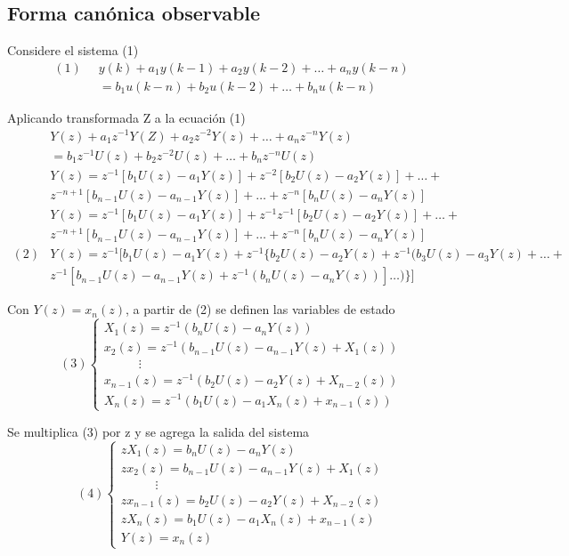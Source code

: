 \subsection{Forma canónica observable}

Considere el sistema (1)
\[
    \begin{split}
        (1) \;\; & y(k) + a_{1}y(k-1) + a_{2}y(k-2) + \ldots + a_{n}y(k-n) \\
            & = b_{1}u(k-n) + b_{2}u(k-2) + \ldots + b_{n}u(k-n)
    \end{split}
\]

Aplicando transformada Z a la ecuación (1)
\[
    \begin{split}
        & Y(z) + a_{1}z^{-1}Y(Z) + a_{2}z^{-2}Y(z) + \ldots + a_{n}z^{-n}Y(z) \\
        & = b_{1}z^{-1}U(z) + b_{2}z^{-2}U(z) + \ldots + b_{n}z^{-n}U(z) \\
        & Y(z) = z^{-1}[b_{1}U(z)-a_{1}Y(z)] + z^{-2}[b_{2}U(z)-a_{2}Y(z)] + \ldots + \\
        & z^{-n+1}[b_{n-1}U(z)-a_{n-1}Y(z)] + \ldots + z^{-n}[b_{n}U(z)-a_{n}Y(z)] \\
        & Y(z) = z^{-1}[b_{1}U(z)-a_{1}Y(z)] + z^{-1}z^{-1}[b_{2}U(z)-a_{2}Y(z)] + \ldots + \\
        & z^{-n+1}[b_{n-1}U(z)-a_{n-1}Y(z)] + \ldots + z^{-n}[b_{n}U(z)-a_{n}Y(z)] \\
        (2) & Y(z) = z^{-1} [b_{1}U(z)-a_{1}Y(z) + z^{-1}\{b_{2}U(z)-a_{2}Y(z) + z^{-1}(b_{3}U(z)-a_{3}Y(z) + \ldots + \\
        & z^{-1}[b_{n-1}U(z)-a_{n-1}Y(z) + z^{-1}(b_{n}U(z)-a_{n}Y(z))]\ldots)\}]
    \end{split}
\]

Con \( Y(z) = x_{n}(z) \), a partir de (2) se definen las variables de estado
\[(3)
    \left\{
        \begin{array}{lll}
            X_{1}(z) = z^{-1}(b_{n}U(z)-a_{n}Y(z)) \\ 
            x_{2}(z) = z^{-1}(b_{n-1}U(z)-a_{n-1}Y(z)+X_{1}(z)) \\
            \;\;\;\;\;\;\;\;\;\; \vdots \\
            x_{n-1}(z) = z^{-1}(b_{2}U(z)-a_{2}Y(z) + X_{n-2}(z)) \\
            X_{n}(z) = z^{-1}(b_{1}U(z)-a_{1}X_{n}(z)+x_{n-1}(z))
        \end{array}
    \right.
\]

Se multiplica (3) por z y se agrega la salida del sistema
\[(4)
    \left\{
        \begin{array}{lll}
            zX_{1}(z) = b_{n}U(z)-a_{n}Y(z) \\ 
            zx_{2}(z) = b_{n-1}U(z)-a_{n-1}Y(z)+X_{1}(z) \\
            \;\;\;\;\;\;\;\;\;\; \vdots \\
            zx_{n-1}(z) = b_{2}U(z)-a_{2}Y(z) + X_{n-2}(z) \\
            zX_{n}(z) = b_{1}U(z)-a_{1}X_{n}(z)+x_{n-1}(z) \\
            Y(z) = x_{n}(z)
        \end{array}
    \right.
\]

